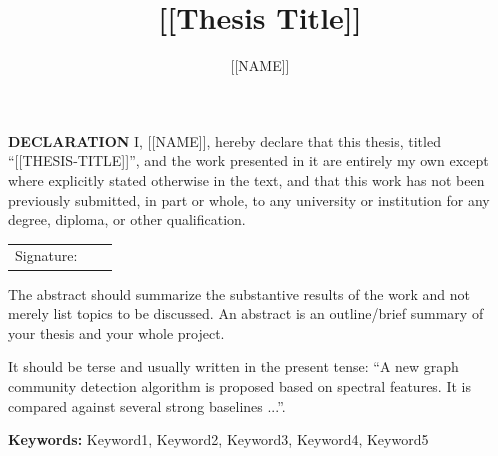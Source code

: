 \documentclass[a4paper,12pt]{Classes/RoboticsLaTeX}
\title{\Large{[[Thesis Title]]}}
\author{[[NAME]]}
\begin{document}
	\begin{spacing}{1}
		\maketitle
	\end{spacing}
	
	\newpage\null\thispagestyle{empty}\newpage
	
	\setcounter{secnumdepth}{3}
	\setcounter{tocdepth}{3}
	
	\frontmatter
	
	\textbf{DECLARATION} 
	I, [[NAME]], hereby declare that this thesis, titled ``[[THESIS-TITLE]]'', and the work presented in it are entirely my own except where explicitly stated otherwise in the text, and that this work has not been previously submitted, in part or whole, to any university or institution for any degree, diploma, or other qualification. 
	\newline
	
	\begin{tabular}{@{}p{.5in}p{4in}@{}}
		Signature: & ~~\hrulefill \\
	\end{tabular}
	\newpage
	
	
	
	
	\begin{abstracts}
		The abstract should summarize the substantive results of the work and not merely list topics to be discussed. An abstract is an outline/brief summary of your thesis and your whole project. 
		
		It should be terse and usually written in the present tense: ``A new graph community detection algorithm is proposed based on spectral features. It is compared against several strong baselines ...''.
		
		\textbf{Keywords: } Keyword1, Keyword2, Keyword3, Keyword4, Keyword5
	\end{abstracts}
	
	
	\tableofcontents
	\listoffigures
	\listoftables
	\printglossary[title=List of Acronyms,type=\acronymtype]
	
	
	
	
	
	\mainmatter
	
\end{document}
